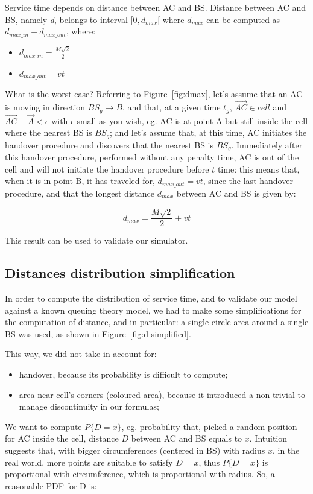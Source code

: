 \documentclass[a4paper,12pt]{article}
\begin{document}
Service time depends on distance between AC and BS.
Distance between AC and BS, namely \emph{d}, belongs to interval $[ 0, d_{max} [$ where $d_{max}$ can be computed as $d_{max\_in} + d_{max\_out}$, where:
\begin{itemize}
  \item $d_{max\_in} = \frac{M \sqrt{2}}{2} $
  \item $d_{max\_out} = vt$
\end{itemize}

What is the worst case? Referring to Figure~\ref{fig:dmax}, let's assume that an AC is moving in direction $BS_g \rightarrow B$, and that, at a given time $t_g$, $\overrightarrow{AC} \in cell$ and $\overrightarrow{AC} - \overrightarrow{A} < \epsilon$ with $\epsilon$ small as you wish, eg. AC is at point A but still inside the cell where the nearest BS is $BS_g$; and let's assume that, at this time, AC initiates the handover procedure and discovers that the nearest BS is $BS_g$. Immediately after this handover procedure, performed without any penalty time, AC is out of the cell and will not initiate the handover procedure before $t$ time: this means that, when it is in point B, it has traveled for, $d_{max\_out} = v t$, since the last handover procedure, and that the longest distance $d_{max}$ between AC and BS is given by:

$$ d_{max} = \frac{M \sqrt{2}}{2} + vt $$

This result can be used to validate our simulator.

\subsection{Distances distribution simplification}
In order to compute the distribution of service time, and to validate our model against a known queuing theory model, we had to make some simplifications for the computation of distance, and in particular: a single circle area around a single BS was used, as shown in Figure~\ref{fig:d-simplified}.

This way, we did not take in account for:
\begin{itemize}
  \item handover, because its probability is difficult to compute;
  \item area near cell's corners (coloured area), because it introduced a non-trivial-to-manage discontinuity in our formulas;
\end{itemize}

We want to compute $P\{D = x\}$, eg. probability that, picked a random position for AC inside the cell, distance $D$ between AC and BS equals to $x$.
Intuition suggests that, with bigger circumferences (centered in BS) with radius $x$, in the real world, more points are suitable to satisfy $D = x$, thus $P\{D = x\}$ is proportional with circumference, which is proportional with radius.
So, a reasonable PDF for D is:
\end{document}
